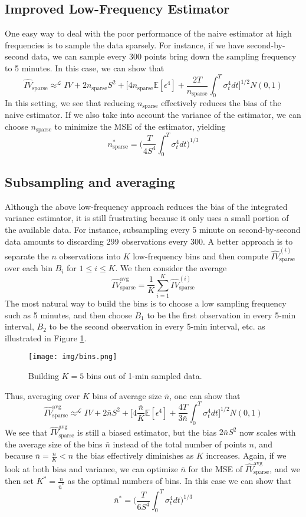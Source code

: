 \documentclass[a4paper,12pt,twoside]{article}
\begin{document}
\subsection{Improved Low-Frequency Estimator}
One easy way to deal with the poor performance of the naive estimator at high frequencies is to sample the data sparsely. For instance, if we have second-by-second data, we can sample every 300 points bring down the sampling frequency to 5 minutes.
In this case, we can show that $$\hat{IV}_\text{sparse} \approx^{\mathcal{L}} IV + 2n_\text{sparse}S^2 + \big[ 4n_\text{sparse}\mathbb{E}[\epsilon^4]+\frac{2T}{n_\text{sparse}}\int_0^T \sigma_t^4 dt \big]^{1/2}N(0,1)$$
In this setting, we see that reducing $n_\text{sparse}$ effectively reduces the bias of the naive estimator. If we also take into account the variance of the estimator, we can choose $n_\text{sparse}$ to minimize the MSE of the estimator, yielding $$n_\text{sparse}^* = \big( \frac{T}{4S^4}\int_0^T \sigma_t^4 dt \big)^{1/3}$$

\subsection{Subsampling and averaging}
Although the above low-frequency approach reduces the bias of the integrated variance estimator, it is still frustrating because it only uses a small portion of the available data. For instance, subsampling every 5 minute on second-by-second data amounts to discarding 299 observations every 300. A better approach is to separate the $n$ observations into $K$ low-frequency bins and then compute $\hat{IV}_\text{sparse}^{(i)}$ over each bin $B_i$ for $1\leq i \leq K$. We then consider the average $$\hat{IV}_\text{sparse}^\text{avg}=\frac{1}{K}\sum_{i=1}^K \hat{IV}_\text{sparse}^{(i)}$$
The most natural way to build the bins is to choose a low sampling frequency such as 5 minutes, and then choose $B_1$ to be the first observation in every 5-min interval, $B_2$ to be the second observation in every 5-min interval, etc. as illustrated in Figure \ref{fig-bins}.

\begin{figure}[h]
    \centering
    \texttt{[image: img/bins.png]}
    \caption{Building $K=5$ bins out of 1-min sampled data.}
    \label{fig-bins}
\end{figure}

Thus, averaging over $K$ bins of average size $\bar{n}$, one can show that $$\hat{IV}_\text{sparse}^\text{avg} \approx^{\mathcal{L}} IV + 2\bar{n}S^2 + \big[ 4\frac{\bar{n}}{K}\mathbb{E}[\epsilon^4]+\frac{4T}{3\bar{n}}\int_0^T \sigma_t^4 dt \big]^{1/2}N(0,1)$$
We see that $\hat{IV}_\text{sparse}^\text{avg}$ is still a biased estimator, but the bias $2\bar{n}S^2$ now scales with the average size of the bins $\bar{n}$ instead of the total number of points $n$, and because $\bar{n}=\frac{n}{K}<n$ the bias effectively diminishes as $K$ increases. Again, if we look at both bias and variance, we can optimize $\bar{n}$ for the MSE of $\hat{IV}_\text{sparse}^\text{avg}$, and we then set $K^*=\frac{n}{\bar{n}^*}$ as the optimal numbers of bins. In this case we can show that $$\bar{n}^*=\big( \frac{T}{6S^4} \int_0^T \sigma_t^4 dt \big)^{1/3}$$
\end{document}
